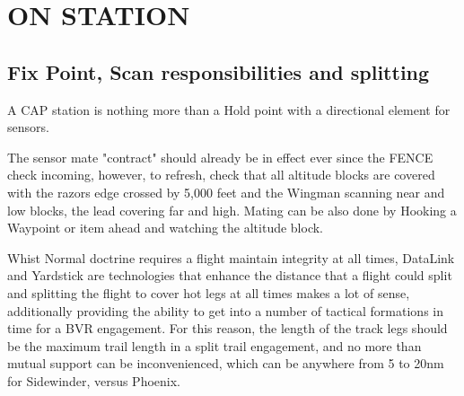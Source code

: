 \section{ON STATION}

\subsection{Fix Point, Scan responsibilities and splitting}

A CAP station is nothing more than a Hold point with a directional element for
sensors.


The sensor mate "contract" should already be in effect ever since the FENCE
check incoming, however, to refresh, check that all altitude blocks are covered
with the razors edge crossed by 5,000 feet and the Wingman scanning near and
low blocks, the lead covering far and high. Mating can be also done by Hooking
a Waypoint or item ahead and watching the altitude block.

Whist Normal doctrine requires a flight maintain integrity at all times,
DataLink and Yardstick are technologies that enhance the distance that a flight
could split and splitting the flight to cover hot legs at all times makes a lot
of sense, additionally providing the ability to get into a number of tactical
formations in time for a BVR engagement. For this reason, the length of the
track legs should be the maximum trail length in a split trail engagement, and
no more than mutual support can be inconvenienced, which can be anywhere from 5
to 20nm for Sidewinder, versus Phoenix.
